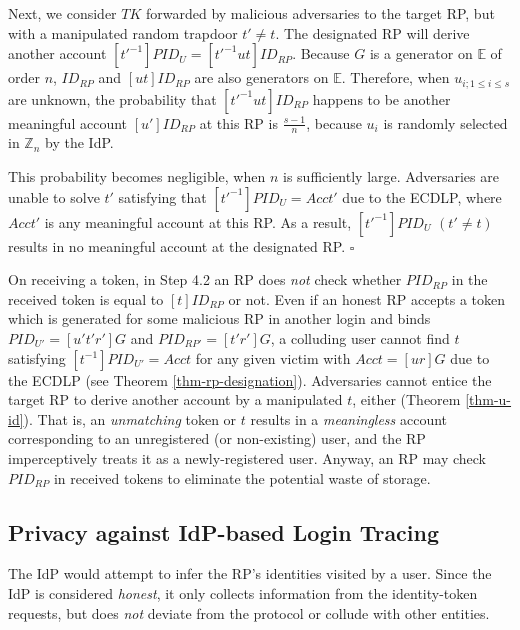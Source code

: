 Next, we consider $TK$ forwarded by malicious adversaries to the target RP, but with a manipulated random trapdoor $t' \neq t$.
The designated RP will derive another account $[t'^{-1}]PID_U = [t'^{-1}ut]ID_{RP}$.
Because $G$ is a generator on $\mathbb{E}$ of order $n$, $ID_{RP}$ and $[ut]ID_{RP}$ are also generators on $\mathbb{E}$.
Therefore, when $u_{i; 1\leq i \leq s}$ are unknown, the probability that $[t'^{-1}ut]ID_{RP}$ happens to be another meaningful account $[u']ID_{RP}$ at this RP is $\frac{s-1}{n}$,
because $u_i$ is randomly selected in $\mathbb{Z}_n$ by the IdP.

This probability becomes negligible, when $n$ is sufficiently large.
Adversaries are unable to solve $t'$ satisfying that $[t'^{-1}]PID_U = Acct'$  due to the ECDLP, where $Acct'$ is any meaningful account at this RP.
As a result, $[t'^{-1}]PID_U$ $(t' \neq t)$ results in no meaningful account at the designated RP. 
\hfill $\square$
\vspace{1.5mm}


On receiving a token, in Step 4.2 an RP does \emph{not} check whether $PID_{RP}$ in the received token is equal to $[t]{ID_{RP}}$ or not.
Even if an honest RP accepts a token which is generated for some malicious RP in another login and binds $PID_{U'} = [u't'r']G$ and $PID_{RP'}=[t'r']G$,
 a colluding user cannot find $t$ satisfying $[t^{-1}]PID_{U'} = Acct$ for any given victim with $Acct = [ur]G$
 due to the ECDLP %
 (see Theorem \ref{thm-rp-designation}).
Adversaries cannot entice the target RP to derive another account by a manipulated $t$, either (Theorem \ref{thm-u-id}).
That is, an \emph{unmatching} token or $t$ results in a \emph{meaningless} account corresponding to an unregistered (or non-existing) user, and the RP imperceptively treats it as a newly-registered user.
Anyway, an RP may check $PID_{RP}$ in received tokens to eliminate the potential waste of storage.

\subsection{Privacy against IdP-based Login Tracing}
\label{subsec:IdP-privacy}

The IdP would attempt to infer the RP's identities visited by a user. Since the IdP is considered \emph{honest}, it only collects information from the identity-token requests, 
 but does \emph{not} deviate from the protocol or collude with other entities.

